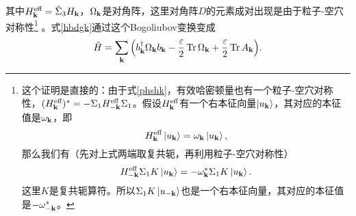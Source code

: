 其中$H^{\text{eff}}_{\vb k}= \tilde \Sigma_3 H_{\vb k}$，$\Omega_{\vb k}$是对角阵，这里对角阵$D$的元素成对出现是由于粒子-空穴对称性\footnote{
这个证明是直接的：由于式\eqref{phshk}，有效哈密顿量也有一个粒子-空穴对称性，$(H^{\text{eff}}_{\vb k})^* = -\Sigma_1 H^{\text{eff}}_{-\vb k} \Sigma_1$。假设$H^{\text{eff}}_{\vb k}$有一个右本征向量$\ket{u_{\vb k}}$，其对应的本征值是$\omega_{\vb k}$，即
\begin{equation}
  H^{\text{eff}}_{\vb k}\ket{u_{\vb k}} = \omega_{\vb k} \ket{u_{\vb k}},
\end{equation}
那么我们有（先对上式两端取复共轭，再利用粒子-空穴对称性）
\begin{equation}
  H^{\text{eff}}_{-\vb k}\Sigma_1 K\ket{u_{\vb k}}=-\omega_{\vb k}^* \Sigma_1 K \ket{u_{\vb k}}.
\end{equation}
这里$K$是复共轭算符。所以$\Sigma_1 K \ket{u_{-{\vb k}}}$也是一个右本征向量，其对应的本征值是$-\omega_{-\vb k}^*$。
} 。式\eqref{hbdgk}通过这个Bogoliubov变换变成
\begin{equation}
  \hat H=\sum_{\vb k} \pqty{b_{\vb k}^\dagger \Omega_{\vb k} b_{\vb k} -\frac{\varepsilon}{2} \Tr \Omega_{\vb k} +\frac{\varepsilon}{2} \Tr A_{\vb k}}.
\end{equation}

